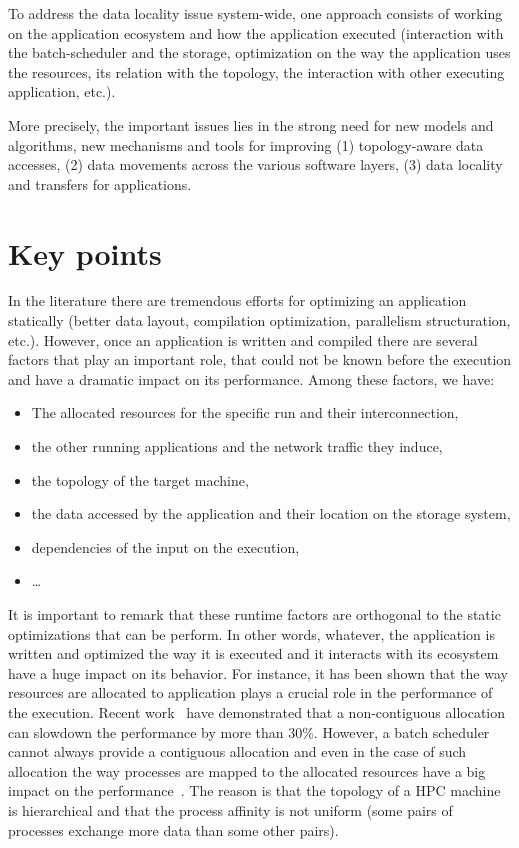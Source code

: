 To address the data locality issue system-wide, one approach consists of
working on the application ecosystem and how the application executed (interaction
with the batch-scheduler and the storage, optimization on the way the
application uses the resources, its relation with the topology, the interaction
with other executing application, etc.). 

More precisely, the important issues lies in the strong need for new models and algorithms, new 
mechanisms and tools for improving (1) topology-aware data accesses, (2) data 
movements across the various software layers, (3) data locality and transfers for 
applications. 


\section{Key points}
In the literature there are tremendous efforts for optimizing an application
statically (better data layout, compilation optimization, parallelism
structuration, etc.). However, once an application is written and compiled there
are several factors that play an important role, that could not be known before
the execution and have a dramatic impact on its performance. Among these
factors, we have: 
\begin{itemize}
\item The allocated resources for the specific run and their interconnection,
\item the other running applications and the network traffic they induce,   
\item the topology of the target machine,
\item the data accessed by the application and their location on the storage
  system,
\item dependencies of the input on the execution,
\item \ldots
\end{itemize}

It is important to remark that these runtime factors are orthogonal to the
static optimizations that can be perform. In other words, whatever, the
application is written and optimized the way it is executed and it interacts
with its ecosystem have a huge impact on its behavior. For instance, it has been
shown that  the way resources are allocated to application plays a crucial role in the
 performance of the execution. Recent work~\cite{cui2013accelerating,kramer13}
 have demonstrated that a non-contiguous allocation
 can slowdown the performance by more than 30\%. However, a batch scheduler cannot
 always provide a contiguous allocation and even in the case of such allocation
 the way processes are mapped to the allocated resources have a big impact on
 the performance~\cite{DBLP:conf/ics/ChenCHRK06,jm10}. The reason is that the
 topology of a HPC machine is hierarchical and that the process affinity is not
 uniform (some pairs of processes exchange more data than some other
 pairs). 

